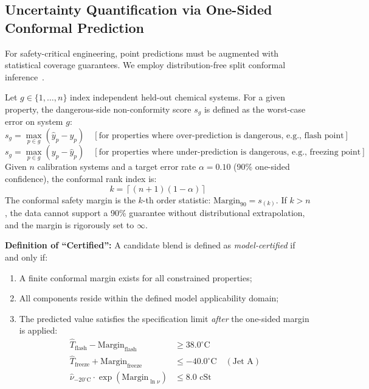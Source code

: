 \documentclass[11pt,a4paper]{article}
\begin{document}
\subsection{Uncertainty Quantification via One-Sided Conformal Prediction}
For safety-critical engineering, point predictions must be augmented with statistical coverage guarantees. We employ distribution-free split conformal inference~\cite{vovk2005algorithmic, angelopoulos2023conformal}.

Let $g \in \{1, \dots, n\}$ index independent held-out chemical systems. For a given property, the dangerous-side non-conformity score $s_g$ is defined as the worst-case error on system $g$:
\begin{equation}
    s_g = \max_{p \in g} \left( \hat{y}_p - y_p \right) \quad [\text{for properties where over-prediction is dangerous, e.g., flash point}]
\end{equation}
\begin{equation}
    s_g = \max_{p \in g} \left( y_p - \hat{y}_p \right) \quad [\text{for properties where under-prediction is dangerous, e.g., freezing point}]
\end{equation}
Given $n$ calibration systems and a target error rate $\alpha = 0.10$ (90\% one-sided confidence), the conformal rank index is:
\begin{equation}
    k = \left\lceil (n + 1)(1 - \alpha) \right\rceil
\end{equation}
The conformal safety margin is the $k$-th order statistic: $\text{Margin}_{90} = s_{(k)}$. If $k > n$, the data cannot support a 90\% guarantee without distributional extrapolation, and the margin is rigorously set to $\infty$.

\textbf{Definition of ``Certified'':} A candidate blend is defined as \textit{model-certified} if and only if:
\begin{enumerate}
    \item A finite conformal margin exists for all constrained properties;
    \item All components reside within the defined model applicability domain;
    \item The predicted value satisfies the specification limit \textit{after} the one-sided margin is applied:
    \begin{align}
        \hat{T}_{\text{flash}} - \text{Margin}_{\text{flash}} &\ge 38.0^\circ\text{C} \\
        \hat{T}_{\text{freeze}} + \text{Margin}_{\text{freeze}} &\le -40.0^\circ\text{C} \quad (\text{Jet A}) \\
        \hat{\nu}_{-20^\circ\text{C}} \cdot \exp(\text{Margin}_{\ln \nu}) &\le 8.0\text{ cSt}
    \end{align}
\end{enumerate}
\end{document}
